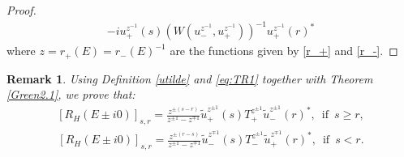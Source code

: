 \documentclass[12pt,oneside,onecolumn,open]{article}
\newtheorem{obs}[teo]{Remark}
\begin{document}
\begin{proof}
\begin{align}
    -iu_{+}^{z^{-1}}(s)(W(u_{-}^{z^{-1}},u_{+}^{z^{-1}}))^{-1} u_{+}^{z^{-1}}(r)^{*} 
  \end{align}
 where $z=r_+ (E)=r_-(E)^{-1}$ are the functions given by \eqref{r_+} and \eqref{r_-}. 
\end{proof}

\begin{obs} Using  Definition \ref{utilde}  and \eqref{eq:TR1} together with Theorem \ref{Green2.1}, we prove that: 
     \begin{align}\label{eq:Green1}
        [R_{H}(E\pm i0)]_{s,r}=\frac{z^{\pm (s-r)}}{z^{\pm 1}-z^{\mp 1}}\tilde{u}_{+}^{z^{\pm 1}}(s)T_{+}^{z^{\pm 1}}\tilde{u}_{-}^{z^{\pm 1}}(r)^{*}, \,\,\, \text{if}\,\,\, s\geq r,
    \end{align}  
 \begin{align}\label{eq:Green2}
        [R_{H}(E\pm  i0)]_{s,r}=\frac{z^{\pm (r-s)}}{z^{\pm 1}-z^{\mp 1}}\tilde{u}_{-}^{z^{\mp 1}}(s)T_{-}^{z^{\pm 1}}\tilde{u}_{+}^{z^{\mp 1}}(r)^{*},\,\,\, \text{if}\,\,\, s<r . 
    \end{align}



\end{obs}
\end{document}
